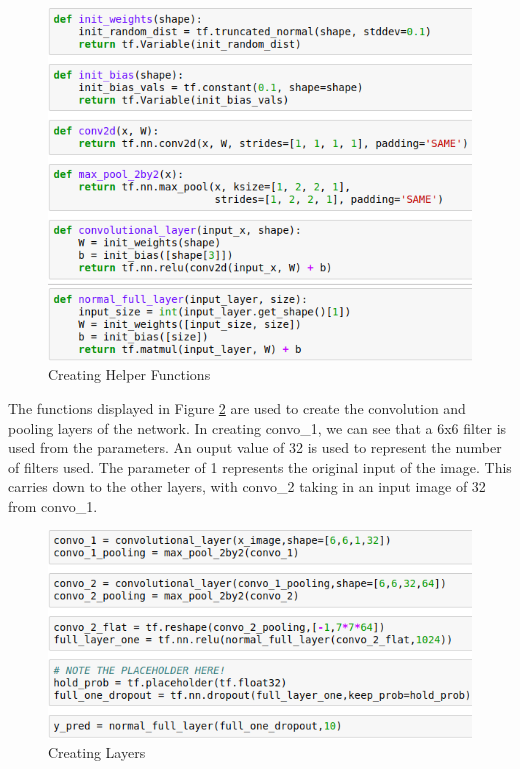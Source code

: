 \documentclass[12pt]{report}
\begin{document}
\vspace{0.5cm}
\begin{figure}[ht!]
	\centering
	\includegraphics[width=12cm]{helpers}
	\caption{Creating Helper Functions}
	\label{fig:helpers}
\end{figure}

\begin{flushleft}
The functions displayed in Figure \ref{fig:layers} are used to create the convolution and pooling layers of the network. In creating convo\_1, we can see that a 6x6 filter is used from the parameters. An ouput value of 32 is used to represent the number of filters used. The parameter of 1 represents the original input of the image. This carries down to the other layers, with convo\_2 taking in an input image of 32 from convo\_1.
\end{flushleft}

\vspace{0.5cm}
\begin{figure}[ht!]
	\centering
	\includegraphics[width=12cm]{layers}
	\caption{Creating Layers}
	\label{fig:layers}
\end{figure}
\end{document}
